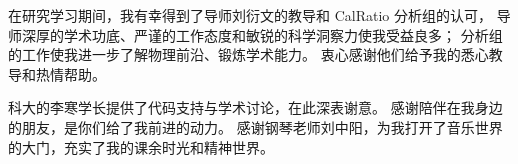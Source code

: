 
\begin{acknowledgements}

    在研究学习期间，我有幸得到了导师刘衍文的教导和 CalRatio 分析组的认可，
    导师深厚的学术功底、严谨的工作态度和敏锐的科学洞察力使我受益良多；
    分析组的工作使我进一步了解物理前沿、锻炼学术能力。
    衷心感谢他们给予我的悉心教导和热情帮助。

    科大的李寒学长提供了代码支持与学术讨论，在此深表谢意。
    感谢陪伴在我身边的朋友，是你们给了我前进的动力。
    感谢钢琴老师刘中阳，为我打开了音乐世界的大门，充实了我的课余时光和精神世界。

\end{acknowledgements}
